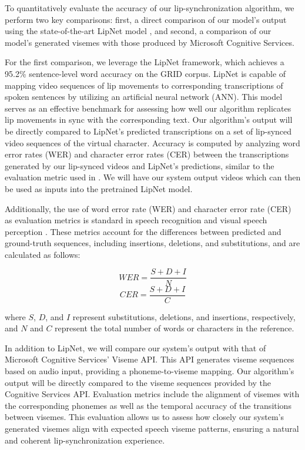 \documentclass[12pt]{article}
\begin{document}
To quantitatively evaluate the accuracy of our lip-synchronization algorithm, we perform two key comparisons: first, a direct comparison of our model’s output using the state-of-the-art LipNet model \cite{AssaelLIPNET:LIPREADING}, and second, a comparison of our model’s generated visemes with those produced by Microsoft Cognitive Services.

For the first comparison, we leverage the LipNet framework, which achieves a 95.2\% sentence-level word accuracy on the GRID corpus. LipNet is capable of mapping video sequences of lip movements to corresponding transcriptions of spoken sentences by utilizing an artificial neural network (ANN). This model serves as an effective benchmark for assessing how well our algorithm replicates lip movements in sync with the corresponding text. Our algorithm’s output will be directly compared to LipNet’s predicted transcriptions on a set of lip-synced video sequences of the virtual character. Accuracy is computed by analyzing word error rates (WER) and character error rates (CER) between the transcriptions generated by our lip-synced videos and LipNet’s predictions, similar to the evaluation metric used in \cite{AssaelLIPNET:LIPREADING}.  We will have our system output videos which can then be used as inputs into the pretrained LipNet model.

Additionally, the use of word error rate (WER) and character error rate (CER) as evaluation metrics is standard in speech recognition and visual speech perception \cite{KlakowTestingQ}. These metrics account for the differences between predicted and ground-truth sequences, including insertions, deletions, and substitutions, and are calculated as follows:

\[
WER = \frac{S + D + I}{N}
\]
\[
CER = \frac{S + D + I}{C}
\]

where $S$, $D$, and $I$ represent substitutions, deletions, and insertions, respectively, and $N$ and $C$ represent the total number of words or characters in the reference.

In addition to LipNet, we will compare our system’s output with that of Microsoft Cognitive Services’ Viseme API. This API generates viseme sequences based on audio input, providing a phoneme-to-viseme mapping. Our algorithm’s output will be directly compared to the viseme sequences provided by the Cognitive Services API. Evaluation metrics include the alignment of visemes with the corresponding phonemes as well as the temporal accuracy of the transitions between visemes. This evaluation allows us to assess how closely our system’s generated visemes align with expected speech viseme patterns, ensuring a natural and coherent lip-synchronization experience.
\end{document}
